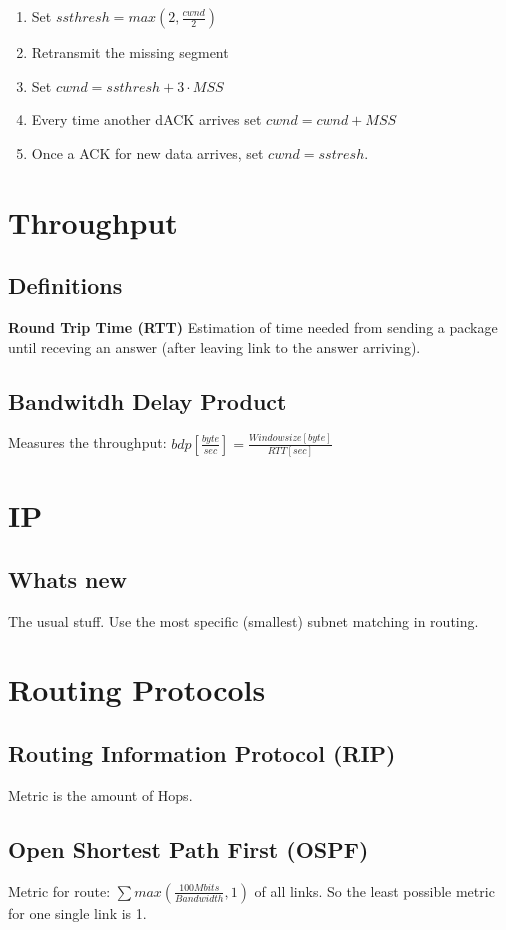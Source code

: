 \documentclass{article}
\begin{document}
\begin{enumerate}
     \item Set $ssthresh = max(2, \frac{cwnd}{2})$
     \item Retransmit the missing segment
     \item Set $cwnd = ssthresh + 3 \cdot MSS$
     \item Every time another dACK arrives set $cwnd = cwnd + MSS$
     \item Once a ACK for new data arrives, set $cwnd = sstresh$.
\end{enumerate}

\section{Throughput}
\subsection{Definitions}

\textbf{Round Trip Time (RTT)}
Estimation of time needed from sending a package until receving an answer (after leaving link to the answer arriving).

\subsection{Bandwitdh Delay Product}
Measures the throughput: $bdp [\frac{byte}{sec}] = \frac{Windowsize [byte]}{RTT [sec]}$

\section{IP}
\subsection{Whats new}
The usual stuff. Use the most specific (smallest) subnet matching in routing.

\section{Routing Protocols}
\subsection{Routing Information Protocol (RIP)}
Metric is the amount of Hops.

\subsection{Open Shortest Path First (OSPF)}
Metric for route: $\sum{max (\frac{100 Mbits}{Bandwidth}, 1)}$ of all links. So the least possible metric for one single link is 1.
\end{document}
